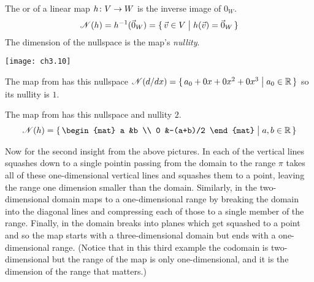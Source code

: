 \begin{definition}
The 
or  of a linear map
\( \mbox{$h\colon V\to W$} \) is the inverse image of $0_W$.
\begin{equation*}
  \mathscr{N}(h)=h^{-1}(\vec{0}_W)=\mbox{$\{\,\vec{v}\in V\bigm| h(\vec{v})=\vec{0}_W\,\}$}
\end{equation*}
The dimension of the nullspace is the map's
{\em nullity}.
\end{definition}

\begin{center}
  \texttt{[image: ch3.10]}
\end{center}

\begin{example}
The map from  has this nullspace
\( \mathscr{N}(d/dx)=\mbox{$\{\,a_0+0x+0x^2+0x^3\bigm| a_0\in\mathbb{R}\,\}$} \)
so its nullity is $1$.
\end{example}

\begin{example}
The map from 
has this nullspace and nullity $2$.
\begin{equation*}
   \nullspace{h}=\set{\begin{mat}
                         a  &b          \\
                         0  &-(a+b)/2
                      \end{mat}\suchthat a,b\in\Re}
\end{equation*}
\end{example}

Now for the second insight from the above pictures.
In  each of the vertical lines  
squashes down 
to a single point\Dash in passing from the domain to the range $\pi$
takes all of these one-dimensional vertical lines and squashes them
to a point, 
leaving the range one dimension smaller than the domain.
Similarly, in  the
two-dimensional domain maps to a one-dimensional range by breaking 
the domain into the diagonal lines 
and compressing each of those to a single member of the range.
Finally, in 
the domain breaks into planes which get
squashed to a point and so the map starts with a three-dimensional domain
but ends with a
one-dimensional range. 
(Notice that in this third example the codomain is
two-dimensional but the range of the map is only one-dimensional, and it is
the dimension of the range that matters.)

